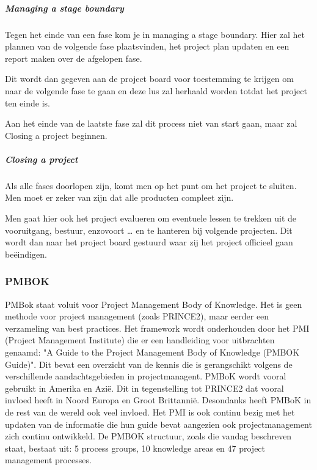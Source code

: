 \documentclass[]{article}
\begin{document}
\subparagraph{Managing a stage boundary}
Tegen het einde van een fase kom je in managing a stage boundary. Hier zal het plannen van de volgende fase plaatsvinden, het project plan updaten en een report maken over de afgelopen fase. 

Dit wordt dan gegeven aan de project board voor toestemming te krijgen om naar de volgende fase te gaan en deze lus zal herhaald worden totdat het project ten einde is. 

Aan het einde van de laatste fase zal dit process niet van start gaan, maar zal Closing a project beginnen.
\subparagraph{Closing a project}
Als alle fases doorlopen zijn, komt men op het punt om het project te sluiten. Men moet er zeker van zijn dat alle producten compleet zijn. 

Men gaat hier ook het project evalueren om eventuele lessen te trekken uit de vooruitgang, bestuur, enzovoort … en te hanteren bij volgende projecten. Dit wordt dan naar het project board gestuurd waar zij het project officieel gaan beëindigen.

\subsubsection{PMBOK}
PMBok staat voluit voor Project Management Body of Knowledge. Het is geen methode voor project management (zoals PRINCE2), maar eerder een verzameling van best practices. Het framework wordt onderhouden door het PMI (Project Management Institute) die er een handleiding voor uitbrachten genaamd: "A Guide to the Project Management Body of Knowledge (PMBOK\textsuperscript{\textregistered} Guide)". Dit bevat een overzicht van de kennis die is gerangschikt volgens de verschillende aandachtsgebieden in projectmanagent. PMBoK wordt vooral gebruikt in Amerika en Azië. Dit in tegenstelling tot PRINCE2 dat vooral invloed heeft in Noord Europa en Groot Brittannië. Desondanks heeft PMBoK in de rest van de wereld ook veel invloed. Het PMI is ook continu bezig met het updaten van de informatie die hun guide bevat aangezien ook projectmanagement zich continu ontwikkeld. De PMBOK\textsuperscript{\textregistered} structuur, zoals die vandag beschreven staat, bestaat uit: 5 process groups, 10 knowledge areas en 47 project management processes.	
\end{document}
